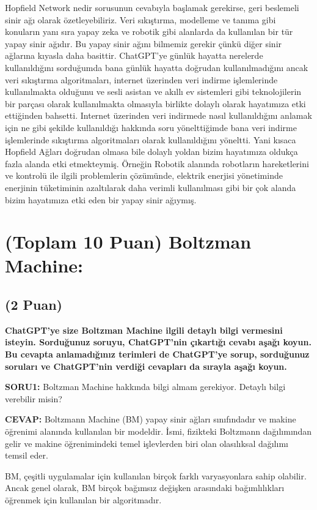 \documentclass[11pt]{article}
\begin{document}
Hopfield Network nedir sorusunun cevabıyla başlamak gerekirse, geri beslemeli sinir ağı olarak özetleyebiliriz.
Veri sıkıştırma, modelleme ve tanıma gibi konuların yanı sıra yapay zeka ve robotik gibi alanlarda da kullanılan bir tür yapay sinir ağıdır.
Bu yapay sinir ağını bilmemiz gerekir çünkü diğer sinir ağlarına kıyasla daha basittir.
ChatGPT'ye günlük hayatta nerelerde kullanıldığını sorduğumda bana günlük hayatta doğrudan kullanılmadığını ancak veri sıkıştırma algoritmaları, internet üzerinden veri indirme işlemlerinde kullanılmakta olduğunu ve sesli asistan ve akıllı ev sistemleri gibi teknolojilerin bir parçası olarak kullanılmakta olmasıyla birlikte dolaylı olarak hayatımıza etki ettiğinden bahsetti. Internet üzerinden veri indirmede nasıl kullanıldığını anlamak için ne gibi şekilde kullanıldığı hakkında soru yönelttiğimde bana veri indirme işlemlerinde  sıkıştırma algoritmaları olarak kullanıldığını yöneltti.
Yani kısaca Hopfield Ağları doğrudan olmasa bile dolaylı yoldan bizim hayatımıza oldukça fazla alanda etki etmekteymiş. Örneğin Robotik alanında robotların hareketlerini ve kontrolü ile ilgili problemlerin çözümünde, elektrik enerjisi yönetiminde enerjinin tüketiminin azaltılarak daha verimli kullanılması gibi bir çok alanda bizim hayatımıza etki eden bir yapay sinir ağıymış.

\section{(Toplam 10 Puan) Boltzman Machine:}

\subsection{(2 Puan)} \textbf{ChatGPT’ye size Boltzman Machine ilgili detaylı bilgi vermesini isteyin. Sorduğunuz soruyu, ChatGPT'nin çıkartığı cevabı aşağı koyun. Bu cevapta anlamadığınız terimleri de ChatGPT’ye sorup, sorduğunuz soruları ve ChatGPT’nin verdiği cevapları da sırayla aşağı koyun.}

\textbf{SORU1:} Boltzman Machine hakkında bilgi almam gerekiyor. Detaylı bilgi verebilir misin?

\textbf{CEVAP:} Boltzmann Machine (BM) yapay sinir ağları sınıfındadır ve makine öğrenimi alanında kullanılan bir modeldir. İsmi, fizikteki Boltzmann dağılımından gelir ve makine öğrenimindeki temel işlevlerden biri olan olasılıksal dağılımı temsil eder.

BM, çeşitli uygulamalar için kullanılan birçok farklı varyasyonlara sahip olabilir. Ancak genel olarak, BM birçok bağımsız değişken arasındaki bağımlılıkları öğrenmek için kullanılan bir algoritmadır.
\end{document}

